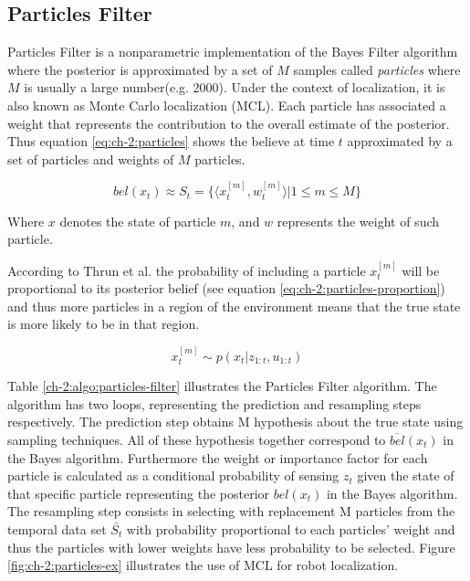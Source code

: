 \subsection{Particles Filter}\label{sec:ch-2:particles-filter}

Particles Filter is a nonparametric implementation of the Bayes Filter algorithm where the posterior is approximated by a set of $M$ samples called \textit{particles} where $M$ is usually a large number(e.g. 2000). Under the context of localization, it is also known as Monte Carlo localization (MCL)\cite{Thrun00j}. Each particle has associated a weight that represents the contribution to the overall estimate of the posterior\cite{Rekleitis:particles-filter}. Thus equation \ref{eq:ch-2:particles}  shows the believe at time $t$ approximated by a set of particles and weights of $M$ particles.

\begin{equation}\label{eq:ch-2:particles}
bel(x_t) \approx S_t = \lbrace \langle x_t^{[m]},w_t^{[m]} \rangle |  1 \leq m \leq M \rbrace
\end{equation}

Where $x$ denotes the state of particle $m$, and $w$ represents the weight of such particle. 

According to Thrun et al. the probability of including a particle $x_t^{[m]}$ will be proportional to its posterior belief (see equation \ref{eq:ch-2:particles-proportion}) and thus more particles in a region of the environment means that the true state is more likely to be in that region.

\begin{equation}\label{eq:ch-2:particles-proportion}
x_t^{[m]} \sim p(x_t | z_{1:t}, u_{1:t})
\end{equation}

Table \ref{ch-2:algo:particles-filter} illustrates the Particles Filter algorithm. The algorithm has two loops, representing the prediction and resampling steps respectively. The prediction step obtains M hypothesis about the true state using sampling techniques. All of these hypothesis together correspond to $\overline{bel}(x_t)$ in the Bayes algorithm. Furthermore the weight or importance factor for each particle is calculated as a conditional probability of sensing $z_t$ given the state of that specific particle representing the posterior $bel(x_t)$ in the Bayes algorithm. The resampling step consists in selecting with replacement M particles from the temporal data set $\bar{S_t}$ with probability proportional to each particles' weight and thus the particles with lower weights have less probability to be selected\cite{Thrun:2005:PR:1121596}. Figure \ref{fig:ch-2:particles-ex} illustrates the use of MCL for robot localization.

